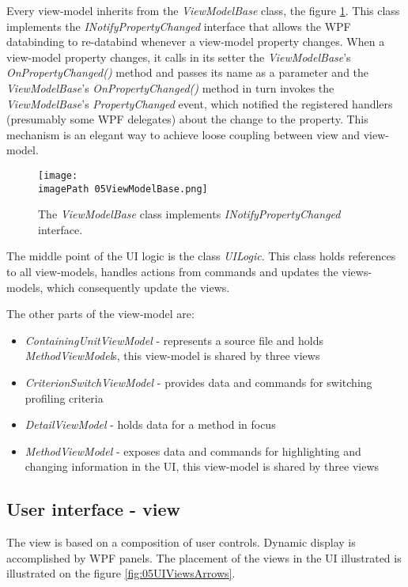 Every view-model inherits from the \textit{ViewModelBase} class, the figure \ref{fig:05ViewModelBase}. This class implements the \textit{INotifyPropertyChanged} interface that allows the WPF databinding to re-databind whenever a view-model property changes. When a view-model property changes, it calls in its setter the \textit{ViewModelBase}'s \textit{OnPropertyChanged()} method and passes its name as a parameter and the \textit{ViewModelBase}'s \textit{OnPropertyChanged()} method in turn invokes the \textit{ViewModelBase}'s \textit{PropertyChanged} event, which notified the registered handlers (presumably some WPF delegates) about the change to the property. This mechanism is an elegant way to achieve loose coupling between view and view-model.
 
 \begin{figure}
	\centering
		\texttt{[image: \\imagePath 05ViewModelBase.png]}
		\caption{The \textit{ViewModelBase} class implements \textit{INotifyPropertyChanged} interface.}
	\label{fig:05ViewModelBase}
\end{figure}

The middle point of the UI logic is the class \textit{UILogic}. This class holds references to all view-models, handles actions from commands and updates the views-models, which consequently update the views.

The other parts of the view-model are:
\begin{itemize}	
\item  \textit{ContainingUnitViewModel} - represents a source file and holds \textit{MethodViewModel}s, this view-model is shared by three views	

\item \textit{CriterionSwitchViewModel} - provides data and commands for switching profiling criteria

\item \textit{DetailViewModel} - holds data for a method in focus

\item \textit{MethodViewModel} - exposes data and commands for highlighting and changing information in the UI, this view-model is shared by three views	
\end{itemize}


\subsection{User interface - view}
The view is based on a composition of user controls. Dynamic display is accomplished by WPF panels. The placement of the views in the UI illustrated is illustrated on the figure \ref{fig:05UIViewsArrows}. 


